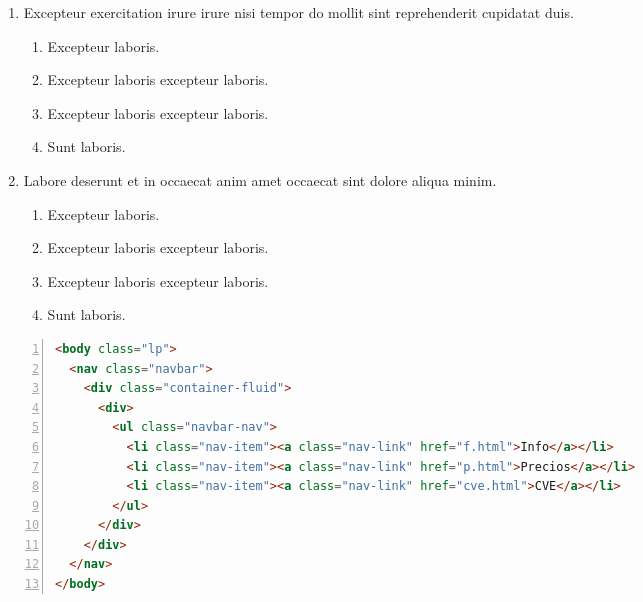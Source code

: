 \documentclass[a4paper,12pt]{article}
\begin{document}
\begin{enumerate}[label=\textbf{\arabic*.}]
\begin{multicols}{2}
\begin{enumerate}
		\item  12pt
    
		\item  15pt
    
		\item  16pt
  
	\end{enumerate}

\end{multicols}
\item Excepteur exercitation irure irure nisi tempor do mollit sint reprehenderit cupidatat duis.
\begin{multicols}{2}
	\begin{enumerate}
		\item  Excepteur laboris.
    
		\item  Excepteur laboris excepteur laboris.
  
		\item  Excepteur laboris excepteur laboris.
    
		\item  Sunt laboris.
    
	\end{enumerate}

\end{multicols}
\item Labore deserunt et in occaecat anim amet occaecat sint dolore aliqua minim.
\begin{multicols}{2}
	\begin{enumerate}
		\item  Excepteur laboris.
    
		\item  Excepteur laboris excepteur laboris.
    
		\item  Excepteur laboris excepteur laboris.
  
		\item  Sunt laboris.
    
	\end{enumerate}

\end{multicols}
\end{enumerate}

\newpage
\begin{lstlisting}[language=HTML, caption={Documento en HTML}, label={lst:1}, numbers=left]
<body class="lp">
  <nav class="navbar">
    <div class="container-fluid">
      <div>
        <ul class="navbar-nav">
          <li class="nav-item"><a class="nav-link" href="f.html">Info</a></li>
          <li class="nav-item"><a class="nav-link" href="p.html">Precios</a></li>
          <li class="nav-item"><a class="nav-link" href="cve.html">CVE</a></li>
        </ul>
      </div>
    </div>
  </nav>
</body>
\end{lstlisting}
\end{document}
